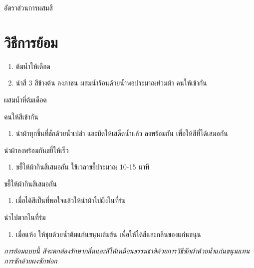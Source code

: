 อัตราส่วนการผสมสี

\section{วิธีการย้อม}

\begin{enumerate}
\def\labelenumi{(\arabic{enumi})}
\item
  ต้มน้ำให้เดือด
\item
  นำสี 3 สีข้างต้น ลงภาชน ผสมน้ำร้อนด้วยน้ำพอประมาณท่วมผ้า คนให้เข้ากัน
\end{enumerate}


ผสมน้ำที่ต้มเดือด


คนให้สีเข้ากัน

\begin{enumerate}
\def\labelenumi{(\arabic{enumi})}
\setcounter{enumi}{2}
\tightlist
\item
  นำผ้าทุกชิ้นที่ชักด้วยน้ำเปล่า และบิดให้เสด็ดน้ำแล้ว ลงพร้อมกัน
  เพื่อให้สีที่ได้เสมอกัน
\end{enumerate}


นำผ้าลงพร้อมกันขยี้ให้เร็ว

\begin{enumerate}
\def\labelenumi{(\arabic{enumi})}
\setcounter{enumi}{3}
\tightlist
\item
  ขยี้ให้ผ้ากินสีเสมอกัน ใข้เวลาขยี้ประมาณ 10-15 นาที
\end{enumerate}


ขยี้ให้ผ้ากินสีเสมอกัน

\begin{enumerate}
\def\labelenumi{(\arabic{enumi})}
\setcounter{enumi}{4}
\tightlist
\item
  เมื่อได้สีเป็นที่พอใจแล้วให้นำผ้าไปผึ่งในที่ร่ม
\end{enumerate}


นำไปตากในที่ร่ม

\begin{enumerate}
\def\labelenumi{(\arabic{enumi})}
\setcounter{enumi}{5}
\tightlist
\item
  เมื่อแห้ง ให้ชุบด้วยน้ำต้มแก่นขนุนเข้มข้น
  เพื่อให้ได้สีและกลิ่นของแก่นขนุน
\end{enumerate}

\emph{การย้อมแบบนี้
สีจะตกต้องรักษากลิ่นและสีให้เหมือนธรรมชาติด้วยการวิธีซักผ้าด้วยน้ำแก่นขนุนแทนการซักด้วยผงซักฟอก}

